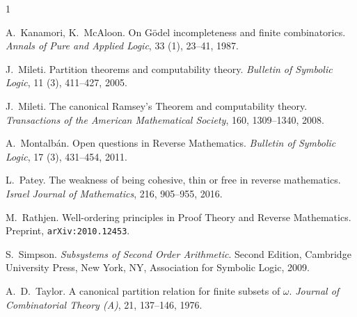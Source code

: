 \documentclass[a4paper,11pt]{article}
\begin{document}
\begin{thebibliography}{1}

A.~Kanamori, K.~McAloon.
On G\"odel incompleteness and finite combinatorics. 
\textit{Annals of Pure and Applied Logic}, 33 (1), 23--41, 1987. 


 J.~Mileti.
Partition theorems and computability theory. 
\textit{Bulletin of Symbolic Logic}, 11 (3), 411--427, 2005.

 J.~Mileti. 
The canonical Ramsey's Theorem and computability theory. 
\textit{Transactions of the American Mathematical Society}, 160, 1309--1340, 2008.

A.~Montalb\'{a}n.
Open questions in Reverse Mathematics.
{\em Bulletin of Symbolic Logic}, 17 (3), 431--454, 2011.

L.~Patey. 
The weakness of being cohesive, thin or free in reverse mathematics. 
{\em Israel Journal of Mathematics}, 216, 905--955, 2016.

M.~Rathjen.
Well-ordering principles in Proof Theory and Reverse Mathematics. 
Preprint, \texttt{arXiv:2010.12453}.


S.~Simpson.
{\em Subsystems of Second Order Arithmetic}.
Second Edition, Cambridge University Press, New York, NY, Association for Symbolic Logic, 2009.

A.~D.~Taylor.
A canonical partition relation for finite subsets of $\omega$. 
{\em Journal of Combinatorial Theory (A)}, 21, 137--146, 1976.




\end{thebibliography}
\end{document}
